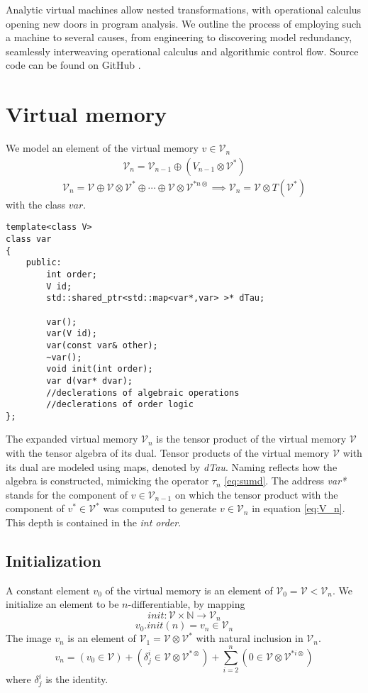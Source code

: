 \documentclass{article}
\newcommand{\VV}{\mathcal{V}}
\newcommand{\sumd}{\tau}
\begin{document}
Analytic virtual machines allow nested transformations, with operational calculus opening new doors in program analysis. We outline the process of employing such a machine to several causes, from engineering to discovering model redundancy, seamlessly interweaving operational calculus and algorithmic control flow. Source code can be found on GitHub \cite{dCpp}.

\section{Virtual memory}\label{sec:virtualMemory}

We model an element of the virtual memory $v\in\VV_n$ \cite[Claim~4.1]{OperationalCalculus}
\begin{eqnarray}
\VV_{n}=\VV_{n-1}\oplus(V_{n-1}\otimes\VV^*) \label{eq:V_n}
\end{eqnarray}
\begin{equation}
\VV_{n}=\VV\oplus\VV\otimes\VV^*\oplus\cdots\oplus\VV\otimes\VV^{*n\otimes} \implies\VV_n=\VV\otimes T(\VV^*)
\end{equation}
with the class $var$.

\begin{lstlisting}
template<class V>
class var
{
    public:
    	int order;
        V id;
        std::shared_ptr<std::map<var*,var> >* dTau;

        var();
        var(V id);
        var(const var& other);
        ~var();
        void init(int order);
        var d(var* dvar);
        //declerations of algebraic operations
        //declerations of order logic
};
\end{lstlisting}

The expanded virtual memory $\VV_n$ is the tensor product of the virtual memory $\VV$ with the tensor algebra of its dual. Tensor products of the virtual memory $\VV$ with its dual are modeled using maps, denoted by \emph{dTau}. Naming reflects how the algebra is constructed, mimicking the operator $\sumd_n$ \eqref{eq:sumd}. The address \emph{var*} stands for the component of $v\in\VV_{n-1}$ on which the tensor product with the component of $v^*\in\VV^*$ was computed to generate $v\in\VV_n$ in equation \eqref{eq:V_n}. This depth is contained in the \emph{int order}.

\subsection{Initialization}

A constant element $v_0$ of the virtual memory is an element of $\VV_0=\VV<\VV_n$. We initialize an element to be $n$-differentiable, by mapping
\begin{equation}
init:\VV\times\mathbb{N}\to\VV_n
\end{equation}
\begin{equation}
v_0.init(n)=v_n\in\VV_n
\end{equation}
The image $v_n$ is an element of $\VV_1=\VV\otimes\VV^*$ with natural inclusion in $\VV_n$.
\begin{equation}
v_n=(v_0\in\VV)+(\delta^i_j\in\VV\otimes\VV^ {*\otimes})+\sum\limits_{i=2}^n(0\in\VV\otimes\VV^ {*i\otimes})
\end{equation}
where $\delta^i_j$ is the identity.
\end{document}
